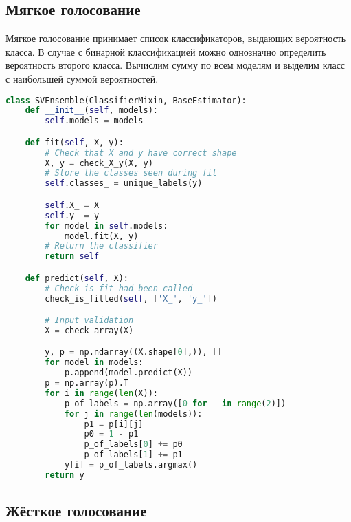\subsection{Мягкое голосование}

Мягкое голосование принимает список классификаторов, выдающих вероятность класса. В случае с бинарной классификацией можно однозначно определить вероятность второго класса. Вычислим сумму по всем моделям и выделим класс с наибольшей суммой вероятностей.
\begin{lstlisting}[language=Python]
class SVEnsemble(ClassifierMixin, BaseEstimator):
    def __init__(self, models):
        self.models = models

    def fit(self, X, y):
        # Check that X and y have correct shape
        X, y = check_X_y(X, y)
        # Store the classes seen during fit
        self.classes_ = unique_labels(y)

        self.X_ = X
        self.y_ = y
        for model in self.models:
            model.fit(X, y)
        # Return the classifier
        return self

    def predict(self, X):
        # Check is fit had been called
        check_is_fitted(self, ['X_', 'y_'])

        # Input validation
        X = check_array(X)

        y, p = np.ndarray((X.shape[0],)), []
        for model in models:
            p.append(model.predict(X))
        p = np.array(p).T
        for i in range(len(X)):
            p_of_labels = np.array([0 for _ in range(2)])
            for j in range(len(models)):
                p1 = p[i][j]
                p0 = 1 - p1
                p_of_labels[0] += p0
                p_of_labels[1] += p1
            y[i] = p_of_labels.argmax()
        return y
\end{lstlisting}
\pagebreak

\subsection{Жёсткое голосование}

